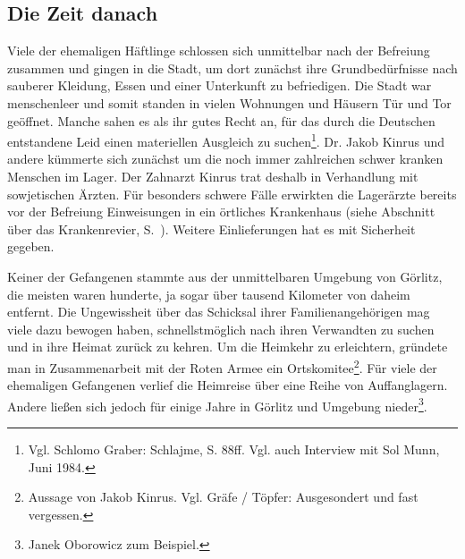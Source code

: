 \documentclass[a4paper,12pt,ngerman,
]{nisebook}
\begin{document}


\subsection{Die Zeit danach}
Viele der ehemaligen Häftlinge schlossen sich unmittelbar nach der Befreiung zusammen und gingen in die Stadt, um dort zunächst ihre Grundbedürfnisse nach sauberer Kleidung, Essen und einer Unterkunft zu befriedigen. Die Stadt war menschenleer und somit standen in vielen Wohnungen und Häusern Tür und Tor geöffnet. Manche sahen es als ihr gutes Recht an, für das durch die Deutschen entstandene Leid einen materiellen Ausgleich zu suchen\footnote{Vgl. Schlomo Graber: Schlajme, S. 88ff. Vgl. auch Interview mit Sol Munn,  Juni 1984.}. Dr. Jakob Kinrus und andere kümmerte sich zunächst um die noch immer zahlreichen schwer kranken Menschen im Lager. Der Zahnarzt Kinrus trat deshalb in Verhandlung mit sowjetischen Ärzten. Für besonders schwere Fälle erwirkten die Lagerärzte bereits vor der Befreiung Einweisungen in ein örtliches Krankenhaus (siehe Abschnitt über das Krankenrevier, S.~\pageref{krankenhaus}). Weitere Einlieferungen hat es mit Sicherheit gegeben. 

Keiner der Gefangenen stammte aus der unmittelbaren Umgebung von Görlitz, die meisten waren hunderte, ja sogar über tausend Kilometer von daheim entfernt. Die Ungewissheit über das Schicksal ihrer Familienangehörigen mag viele dazu bewogen haben, schnellstmöglich nach ihren Verwandten zu suchen und in ihre Heimat zurück zu kehren. Um die Heimkehr zu erleichtern, gründete man in Zusammenarbeit mit der Roten Armee ein Ortskomitee\footnote{Aussage von Jakob Kinrus. Vgl. Gräfe / Töpfer: Ausgesondert und fast vergessen.}. Für viele der ehemaligen Gefangenen verlief die Heimreise über eine Reihe von Auffanglagern. Andere ließen sich jedoch für einige Jahre in Görlitz und Umgebung nieder\footnote{Janek Oborowicz zum Beispiel.}. 

\end{document}
